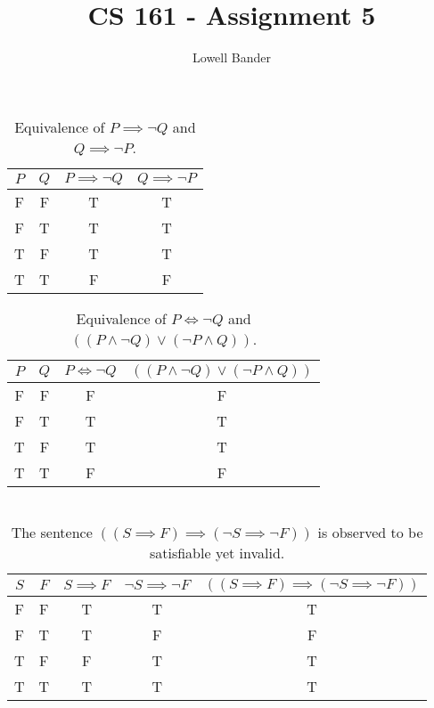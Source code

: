 \documentclass[]{article}
\begin{document}
\title{CS 161 - Assignment 5}
\author{Lowell Bander}
\maketitle

\section{}
\begin{table}[h]
\centering
\begin{tabular}{ c | c | c | c }
$P$ & $Q$ & $P \implies \neg Q$  & $Q \implies \neg P$ \\\hline
F & F & T & T\\
F & T & T & T\\
T & F & T & T\\
T & T & F & F\\
\end{tabular}
\caption{Equivalence of $P \implies \neg Q$  and $Q \implies \neg P$.}
\end{table}

\begin{table}[h]
\centering
\begin{tabular}{ c | c | c | c }
$P$ & $Q$ & $P \iff \neg Q$  & $((P \land \neg Q) \lor (\neg P \land Q))$ \\\hline
F & F & F & F\\
F & T & T & T\\
T & F & T & T\\
T & T & F & F\\
\end{tabular}
\caption{Equivalence of $P \iff \neg Q$  and $((P \land \neg Q) \lor (\neg P \land Q))$.}
\end{table}

\newpage

\section{}

\begin{table}[h]
\centering
\begin{tabular}{ c | c | c | c | c}
$S$ & $F$ & $S \implies F$ & $\neg S \implies \neg F$ & $((S \implies F) \implies (\neg S \implies \neg F))$ \\\hline
F & F & T & T & T\\
F & T & T & F & F\\
T & F & F & T & T\\
T & T & T & T & T\\
\end{tabular}
\caption{The sentence $((S \implies F) \implies (\neg S \implies \neg F))$ is observed to be satisfiable yet invalid.}
\end{table}
\end{document}
